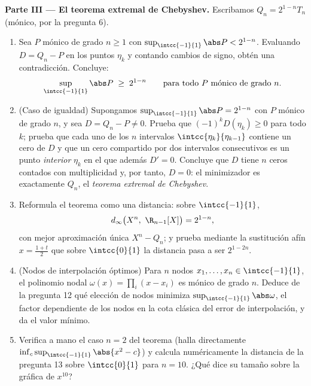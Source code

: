 \begin{problem}
\medskip
\noindent\textbf{Parte III --- El teorema extremal de Chebyshev.}
Escribamos $Q_n = 2^{1-n}T_n$ (mónico, por la pregunta 6).
\begin{enumerate}[resume]
  \item Sea $P$ mónico de grado $n \geq 1$ con
        $\sup_{\intcc{-1}{1}}\abs P < 2^{1-n}$. Evaluando $D = Q_n -
        P$ en los puntos $\eta_k$ y contando cambios de signo,
        obtén una contradicción. Concluye:
        \[
        \sup_{\intcc{-1}{1}}\abs P \;\geq\; 2^{1-n}
        \qquad\text{para todo } P \text{ mónico de grado } n.
        \]
  \item (Caso de igualdad) Supongamos $\sup_{\intcc{-1}{1}}\abs P =
        2^{1-n}$ con $P$ mónico de grado $n$, y sea $D = Q_n - P
        \neq 0$. Prueba que $(-1)^kD(\eta_k) \geq 0$ para todo $k$;
        prueba que cada uno de los $n$ intervalos
        $\intcc{\eta_{k}}{\eta_{k-1}}$ contiene un cero de $D$ y que
        un cero compartido por dos intervalos consecutivos es un
        punto \emph{interior} $\eta_k$ en el que además $D' = 0$.
        Concluye que $D$ tiene $n$ ceros contados con multiplicidad
        y, por tanto, $D = 0$: el minimizador es exactamente $Q_n$,
        el \emph{teorema extremal de Chebyshev}.
  \item Reformula el teorema como una distancia: sobre
        $\intcc{-1}{1}$,
        \[
        d_\infty\bigl(X^n,\ \R_{n-1}[X]\bigr) = 2^{1-n},
        \]
        con mejor aproximación única $X^n - Q_n$; y prueba mediante
        la sustitución afín $x = \frac{1+t}2$ que sobre
        $\intcc{0}{1}$ la distancia pasa a ser $2^{1-2n}$.
  \item (Nodos de interpolación óptimos) Para $n$ nodos $x_1, \dots,
        x_n \in \intcc{-1}{1}$, el polinomio nodal $\omega(x) =
        \prod_i(x - x_i)$ es mónico de grado $n$. Deduce de la
        pregunta 12 qué elección de nodos minimiza
        $\sup_{\intcc{-1}{1}}\abs\omega$, el factor dependiente de
        los nodos en la cota clásica del error de interpolación, y
        da el valor mínimo.
  \item Verifica a mano el caso $n = 2$ del teorema (halla
        directamente $\inf_c \sup_{\intcc{-1}{1}}\abs{x^2 - c}$) y
        calcula numéricamente la distancia de la pregunta 13 sobre
        $\intcc{0}{1}$ para $n = 10$. ¿Qué dice su tamaño sobre la
        gráfica de $x^{10}$?
\end{enumerate}


\end{problem}
